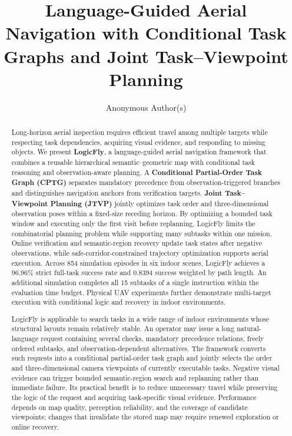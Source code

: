 \documentclass[letterpaper,10pt,journal]{IEEEtran}
\title{\LARGE\bf Language-Guided Aerial Navigation with Conditional Task Graphs and Joint Task--Viewpoint Planning}
\author{Anonymous Author(s)}
\newenvironment{practitioners}{\renewcommand{\abstractname}{Note to Practitioners}\begin{abstract}}{\end{abstract}}
\begin{document}
\maketitle
\thispagestyle{empty}
\pagestyle{empty}
\begin{abstract}
Long-horizon aerial inspection requires efficient travel among multiple targets while respecting task dependencies, acquiring visual evidence, and responding to missing objects. We present \textbf{LogicFly}, a language-guided aerial navigation framework that combines a reusable hierarchical semantic--geometric map with conditional task reasoning and observation-aware planning. A \textbf{Conditional Partial-Order Task Graph (CPTG)} separates mandatory precedence from observation-triggered branches and distinguishes navigation anchors from verification targets. \textbf{Joint Task--Viewpoint Planning (JTVP)} jointly optimizes task order and three-dimensional observation poses within a fixed-size receding horizon. By optimizing a bounded task window and executing only the first visit before replanning, LogicFly limits the combinatorial planning problem while supporting many subtasks within one mission. Online verification and semantic-region recovery update task states after negative observations, while safe-corridor-constrained trajectory optimization supports aerial execution. Across 854 simulation episodes in six indoor scenes, LogicFly achieves a 96.96\% strict full-task success rate and 0.8394 success weighted by path length. An additional simulation completes all 15 subtasks of a single instruction within the evaluation time budget. Physical UAV experiments further demonstrate multi-target execution with conditional logic and recovery in indoor environments.
\end{abstract}

\begin{practitioners}
LogicFly is applicable to search tasks in a wide range of indoor environments whose structural layouts remain relatively stable. An operator may issue a long natural-language request containing several checks, mandatory precedence relations, freely ordered subtasks, and observation-dependent alternatives. The framework converts such requests into a conditional partial-order task graph and jointly selects the order and three-dimensional camera viewpoints of currently executable tasks. Negative visual evidence can trigger bounded semantic-region search and replanning rather than immediate failure. Its practical benefit is to reduce unnecessary travel while preserving the logic of the request and acquiring task-specific visual evidence. Performance depends on map quality, perception reliability, and the coverage of candidate viewpoints; changes that invalidate the stored map may require renewed exploration or online recovery.
\end{practitioners}
\end{document}
